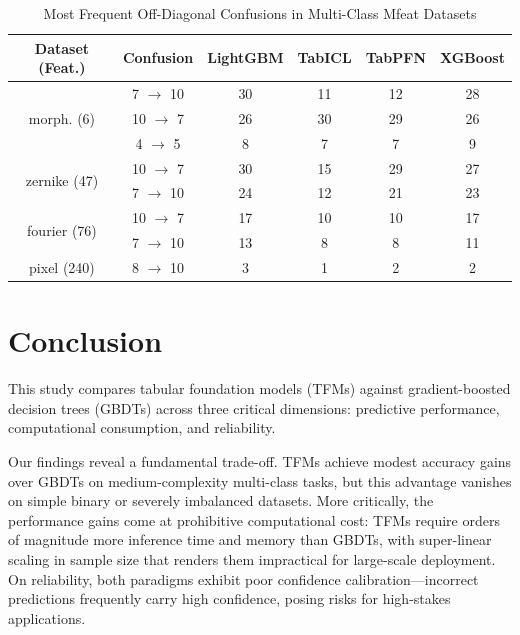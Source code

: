 \documentclass{SYSUReport}
\begin{document}
\begin{table}[H]
    \centering
    \caption{Most Frequent Off-Diagonal Confusions in Multi-Class Mfeat Datasets}
    \label{tab: error-patterns}
    \begin{tabular}{cccccc}
    \hline
    Dataset (Feat.) & Confusion & LightGBM & TabICL & TabPFN & XGBoost \\
    \hline
    \multirow{3}{*}{morph. (6)}
        & 7 $\rightarrow$ 10 & 30 & 11 & 12 & 28 \\
        & 10 $\rightarrow$ 7 & 26 & 30 & 29 & 26 \\
        & 4 $\rightarrow$ 5  &  8 &  7 &  7 &  9 \\
    \hline
    \multirow{2}{*}{zernike (47)}
        & 10 $\rightarrow$ 7 & 30 & 15 & 29 & 27 \\
        & 7 $\rightarrow$ 10 & 24 & 12 & 21 & 23 \\
    \hline
    \multirow{2}{*}{fourier (76)}
        & 10 $\rightarrow$ 7 & 17 & 10 & 10 & 17 \\
        & 7 $\rightarrow$ 10 & 13 &  8 &  8 & 11 \\
    \hline
    pixel (240)
        & 8 $\rightarrow$ 10  &  3 &  1 &  2 &  2 \\
    \hline
    \end{tabular}
\end{table}






\newpage
\section{Conclusion}

This study compares tabular foundation models (TFMs) against gradient-boosted decision trees (GBDTs) across three critical dimensions: predictive performance, computational consumption, and reliability.

Our findings reveal a fundamental trade-off. TFMs achieve modest accuracy gains over GBDTs on medium-complexity multi-class tasks, but this advantage vanishes on simple binary or severely imbalanced datasets. More critically, the performance gains come at prohibitive computational cost: TFMs require orders of magnitude more inference time and memory than GBDTs, with super-linear scaling in sample size that renders them impractical for large-scale deployment. On reliability, both paradigms exhibit poor confidence calibration—incorrect predictions frequently carry high confidence, posing risks for high-stakes applications.
\end{document}
